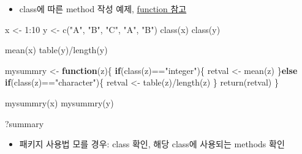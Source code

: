 \documentclass[
]{book}
\newenvironment{Shaded}{\begin{snugshade}}{\end{snugshade}}
\newcommand{\ControlFlowTok}[1]{\textcolor[rgb]{0.13,0.29,0.53}{\textbf{#1}}}
\newcommand{\DecValTok}[1]{\textcolor[rgb]{0.00,0.00,0.81}{#1}}
\newcommand{\FunctionTok}[1]{\textcolor[rgb]{0.00,0.00,0.00}{#1}}
\newcommand{\NormalTok}[1]{#1}
\newcommand{\OtherTok}[1]{\textcolor[rgb]{0.56,0.35,0.01}{#1}}
\newcommand{\SpecialCharTok}[1]{\textcolor[rgb]{0.00,0.00,0.00}{#1}}
\newcommand{\StringTok}[1]{\textcolor[rgb]{0.31,0.60,0.02}{#1}}
\providecommand{\tightlist}{%
  \setlength{\itemsep}{0pt}\setlength{\parskip}{0pt}}
\begin{document}
\begin{itemize}
\tightlist
\item
  class에 따른 method 작성 예제, \href{https://greendaygh.github.io/kribbr2022/r-programming.html\#functions}{function 참고}
\end{itemize}

\begin{Shaded}
\begin{Highlighting}[]

\NormalTok{x }\OtherTok{\textless{}{-}} \DecValTok{1}\SpecialCharTok{:}\DecValTok{10}
\NormalTok{y }\OtherTok{\textless{}{-}} \FunctionTok{c}\NormalTok{(}\StringTok{"A"}\NormalTok{, }\StringTok{"B"}\NormalTok{, }\StringTok{"C"}\NormalTok{, }\StringTok{"A"}\NormalTok{, }\StringTok{"B"}\NormalTok{)}
\FunctionTok{class}\NormalTok{(x)}
\FunctionTok{class}\NormalTok{(y)}

\FunctionTok{mean}\NormalTok{(x)}
\FunctionTok{table}\NormalTok{(y)}\SpecialCharTok{/}\FunctionTok{length}\NormalTok{(y)}

\NormalTok{mysummry }\OtherTok{\textless{}{-}} \ControlFlowTok{function}\NormalTok{(z)\{}
  \ControlFlowTok{if}\NormalTok{(}\FunctionTok{class}\NormalTok{(z)}\SpecialCharTok{==}\StringTok{"integer"}\NormalTok{)\{}
\NormalTok{    retval }\OtherTok{\textless{}{-}} \FunctionTok{mean}\NormalTok{(z)}
\NormalTok{  \}}\ControlFlowTok{else} \ControlFlowTok{if}\NormalTok{(}\FunctionTok{class}\NormalTok{(z)}\SpecialCharTok{==}\StringTok{"character"}\NormalTok{)\{}
\NormalTok{    retval }\OtherTok{\textless{}{-}} \FunctionTok{table}\NormalTok{(z)}\SpecialCharTok{/}\FunctionTok{length}\NormalTok{(z)}
\NormalTok{  \}}
  \FunctionTok{return}\NormalTok{(retval)}
\NormalTok{\}}


\FunctionTok{mysummry}\NormalTok{(x)}
\FunctionTok{mysummry}\NormalTok{(y)}

\NormalTok{?summary}
\end{Highlighting}
\end{Shaded}

\begin{itemize}
\tightlist
\item
  패키지 사용법 모를 경우: class 확인, 해당 class에 사용되는 methods 확인
\end{itemize}
\end{document}
